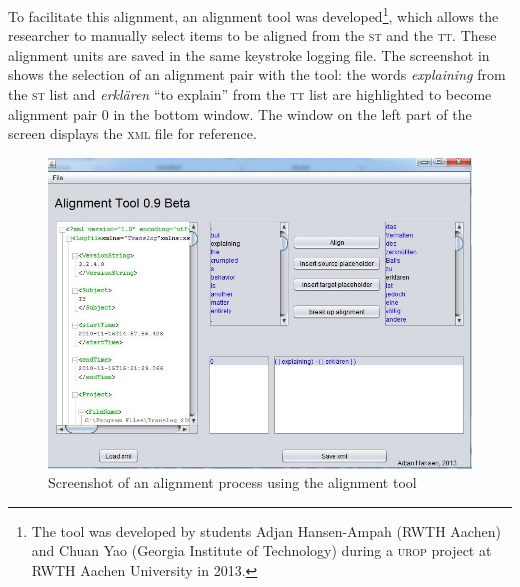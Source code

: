 \documentclass[output=paper]{LSP/langsci}
\begin{document}
To facilitate this alignment, an alignment tool was developed\footnote{The tool was developed by students Adjan Hansen-Ampah (RWTH Aachen) and Chuan Yao (Georgia Institute of Technology) during a \textsc{urop} project at RWTH Aachen University in 2013.}, which allows the researcher to manually select items to be aligned from the \textsc{st} and the \textsc{tt}. These alignment units are saved in the same keystroke logging file. The screenshot in  shows the selection of an alignment pair with the tool: the words \textit{explaining }from the \textsc{st} list and \textit{erklären} “to explain” from the \textsc{tt} list are highlighted to become alignment pair 0 in the bottom window. The window on the left part of the screen displays the \textsc{xml} file for reference.


\begin{figure}
\includegraphics[width=.7\textwidth]{./figures/2-1.jpg}
\caption{Screenshot of an alignment process using the alignment tool} \label{fig:1:1}
\end{figure}
\end{document}
